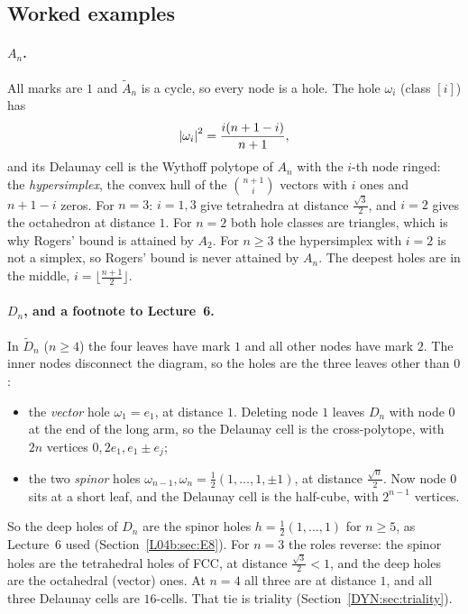 \subsection*{Worked examples}

\paragraph{$A_n$.} All marks are $1$ and $\tilde A_n$ is a cycle, so every node is a hole. The hole
$\omega_i$ (class $[i]$) has
\[
  \left\lvert \omega_i \right\rvert^2=\frac{i(n+1-i)}{n+1},
\]
and its Delaunay cell is the Wythoff polytope of $A_n$ with the $i$-th node ringed: the \emph{hypersimplex},
the convex hull of the $\binom{n+1}i$ vectors with $i$ ones and $n+1-i$ zeros. For $n=3$:
$i=1,3$ give tetrahedra at distance $\frac{\sqrt3}2$, and $i=2$ gives the octahedron at distance $1$. For
$n=2$ both hole classes are triangles, which is why Rogers' bound is attained by $A_2$. For $n\ge3$ the
hypersimplex with $i=2$ is not a simplex, so Rogers' bound is never attained by $A_n$. The deepest holes
are in the middle, $i=\lfloor\frac{n+1}2\rfloor$.

\paragraph{$D_n$, and a footnote to Lecture~6.} In $\tilde D_n$ ($n\ge4$) the four leaves have mark
$1$ and all other nodes have mark $2$. The inner nodes disconnect the diagram, so the holes are the three
leaves other than $0$:
\begin{itemize}
\item the \emph{vector} hole $\omega_1=e_1$, at distance $1$. Deleting node $1$ leaves $D_n$ with node $0$ at
  the end of the long arm, so the Delaunay cell is the cross-polytope, with $2n$ vertices $0,2e_1,e_1\pm e_j$;
\item the two \emph{spinor} holes $\omega_{n-1},\omega_n=\frac12(1,\dots,1,\pm1)$, at distance $\frac{\sqrt n}2$.
  Now node $0$ sits at a short leaf, and the Delaunay cell is the half-cube, with $2^{n-1}$ vertices.
\end{itemize}
So the deep holes of $D_n$ are the spinor holes $h=\frac12(1,\dots,1)$ for $n\ge5$, as Lecture~6 used
(Section~\ref{L04b:sec:E8}). For $n=3$ the roles reverse: the spinor holes are the tetrahedral holes
of FCC, at distance $\frac{\sqrt3}2<1$, and the deep holes are the octahedral (vector) ones. At $n=4$ all three are
at distance $1$, and all three Delaunay cells are $16$-cells. That tie is triality
(Section~\ref{DYN:sec:triality}).

